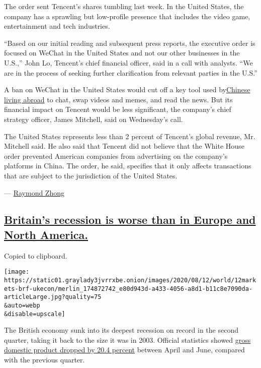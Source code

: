 The order sent Tencent's shares tumbling last week. In the United
States, the company has a sprawling but low-profile presence that
includes the video game, entertainment and tech industries.

``Based on our initial reading and subsequent press reports, the
executive order is focused on WeChat in the United States and not our
other businesses in the U.S.,'' John Lo, Tencent's chief financial
officer, said in a call with analysts. ``We are in the process of
seeking further clarification from relevant parties in the U.S.''

A ban on WeChat in the United States would cut off a key tool used
by\href{https://www.nytimes3xbfgragh.onion/2020/08/07/business/trump-china-wechat-tiktok.html}{Chinese
living abroad} to chat, swap videos and memes, and read the news. But
its financial impact on Tencent would be less significant, the company's
chief strategy officer, James Mitchell, said on Wednesday's call.

The United States represents less than 2 percent of Tencent's global
revenue, Mr. Mitchell said. He also said that Tencent did not believe
that the White House order prevented American companies from advertising
on the company's platforms in China. The order, he said, specifies that
it only affects transactions that are subject to the jurisdiction of the
United States.

--- \href{https://www.nytimes3xbfgragh.onion/by/raymond-zhong}{Raymond
Zhong}

\hypertarget{britains-recession-is-worse-than-in-europe-and-north-america}{%
\subsection{\texorpdfstring{\protect\hyperlink{britains-recession-is-worse-than-in-europe-and-north-america}{Britain's
recession is worse than in Europe and North
America.}}{Britain's recession is worse than in Europe and North America.}}\label{britains-recession-is-worse-than-in-europe-and-north-america}}

Copied to clipboard.

\texttt{[image: https://static01.graylady3jvrrxbe.onion/images/2020/08/12/world/12markets-brf-ukecon/merlin\_174872742\_e80d943d-a433-4056-a8d1-b11c8e7090da-articleLarge.jpg?quality=75\\\&auto=webp\\\&disable=upscale]}

The British economy sunk into its deepest recession on record in the
second quarter, taking it back to the size it was in 2003. Official
statistics showed
\href{https://www.ons.gov.uk/economy/grossdomesticproductgdp/bulletins/gdpfirstquarterlyestimateuk/apriltojune2020}{gross
domestic product dropped by 20.4 percent} between April and June,
compared with the previous quarter.

